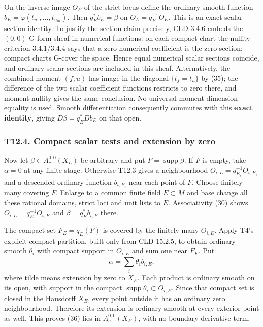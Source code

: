 \documentclass[
  10pt,
]{article}
\begin{document}
On the inverse image \(O_E\) of the strict locus define the ordinary
smooth function \(b_E=\varphi(t_{u_1},\ldots,t_{u_m})\). Then
\(q_E^*b_E=\beta\) on \(O_L=q_E^{-1}O_E\). This is an exact
scalar-section identity. To justify the section claim precisely, CLD
3.4.6 embeds the \((0,0)\) G-form sheaf in numerical functions: on each
compact chart the nullity criterion 3.4.1/3.4.4 says that a zero
numerical coefficient is the zero section; compact charts G-cover the
space. Hence equal numerical scalar sections coincide, and ordinary
scalar sections are included in this sheaf. Alternatively, the combined
moment \((f,u)\) has image in the diagonal \(\{t_f=t_u\}\) by (35); the
difference of the two scalar coefficient functions restricts to zero
there, and moment nullity gives the same conclusion. No universal
moment-dimension equality is used. Smooth differentiation consequently
commutes with this \textbf{exact identity}, giving \(D\beta=q_E^*Db_E\)
on that open.

\subsubsection{T12.4. Compact scalar tests and extension by
zero}\label{t12.4.-compact-scalar-tests-and-extension-by-zero}

Now let \(\beta\in A_c^{0,0}(X_L)\) be arbitrary and put
\(F=\operatorname{supp}\beta\). If \(F\) is empty, take \(\alpha=0\) at
any finite stage. Otherwise T12.3 gives a neighbourhood
\(O_{i,L}=q_{E_i}^{-1}O_{i,E_i}\) and a descended ordinary function
\(b_{i,E_i}\) near each point of \(F\). Choose finitely many covering
\(F\). Enlarge to a common finite field \(E\subset M\) and base change
all these rational domains, strict loci and unit lists to \(E\).
Associativity (30) shows \(O_{i,L}=q_E^{-1}O_{i,E}\) and
\(\beta=q_E^*b_{i,E}\) there.

The compact set \(F_E=q_E(F)\) is covered by the finitely many
\(O_{i,E}\). Apply T4's explicit compact partition, built only from CLD
15.2.5, to obtain ordinary smooth \(\theta_i\) with compact support in
\(O_{i,E}\) and sum one near \(F_E\). Put \[
                \alpha=\sum_i\widetilde{\theta_i b_{i,E}},
                                                               \tag{36}
\] where tilde means extension by zero to \(X_E\). Each product is
ordinary smooth on its open, with support in the compact
\(\operatorname{supp}\theta_i\subset O_{i,E}\). Since that compact set
is closed in the Hausdorff \(X_E\), every point outside it has an
ordinary zero neighbourhood. Therefore its extension is ordinary smooth
at every exterior point as well. This proves (36) lies in
\(A_c^{0,0}(X_E)\), with no boundary derivative term.
\end{document}
